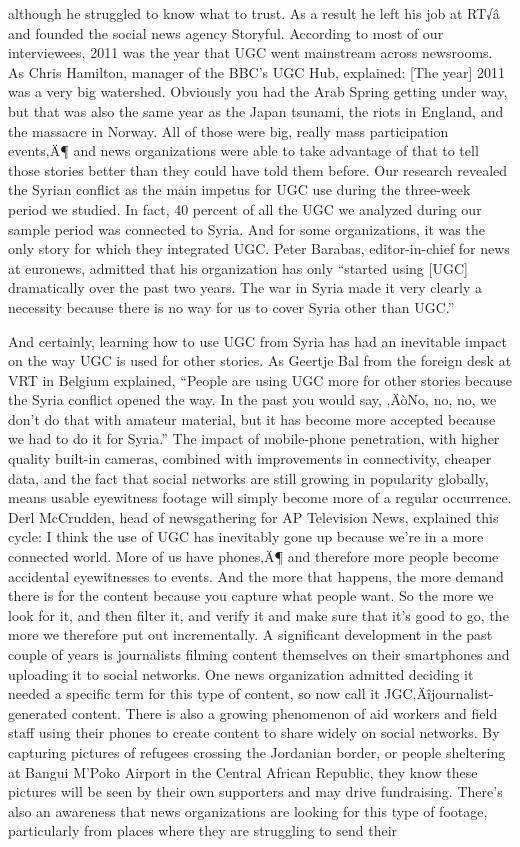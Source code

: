\documentclass[symmetric, notoc, nobib]{towcenter-book}
\begin{document}
although he struggled to know what to trust. As a result he left his job at
RT√â and founded the social news agency Storyful.
According to most of our interviewees, 2011 was the year that UGC went
mainstream across newsrooms. As Chris Hamilton, manager of the BBC's
UGC Hub, explained:
[The year] 2011 was a very big watershed. Obviously you had the
Arab Spring getting under way, but that was also the same year as
the Japan tsunami, the riots in England, and the massacre in Norway.
All of those were big, really mass participation events‚Ä¶ and news
organizations were able to take advantage of that to tell those stories
better than they could have told them before.
Our research revealed the Syrian conflict as the main impetus for UGC use
during the three-week period we studied. In fact, 40 percent of all the UGC
we analyzed during our sample period was connected to Syria. And for
some organizations, it was the only story for which they integrated UGC.
Peter Barabas, editor-in-chief for news at euronews, admitted that his organization
has only ``started using [UGC] dramatically over the past two years.
The war in Syria made it very clearly a necessity because there is no way for
us to cover Syria other than UGC.''

And certainly, learning how to use UGC from Syria has had an inevitable
impact on the way UGC is used for other stories. As Geertje Bal from the
foreign desk at VRT in Belgium explained, ``People are using UGC more
for other stories because the Syria conflict opened the way. In the past you
would say, ‚ÄòNo, no, no, we don't do that with amateur material, but it has
become more accepted because we had to do it for Syria.''
The impact of mobile-phone penetration, with higher quality built-in cameras,
combined with improvements in connectivity, cheaper data, and the
fact that social networks are still growing in popularity globally, means
usable eyewitness footage will simply become more of a regular occurrence.
Derl McCrudden, head of newsgathering for AP Television News, explained
this cycle:
I think the use of UGC has inevitably gone up because we're in a more
connected world. More of us have phones‚Ä¶ and therefore more people
become accidental eyewitnesses to events. And the more that
happens, the more demand there is for the content because you capture
what people want. So the more we look for it, and then filter it,
and verify it and make sure that it's good to go, the more we therefore
put out incrementally.
A significant development in the past couple of years is journalists filming
content themselves on their smartphones and uploading it to social networks.
One news organization admitted deciding it needed a specific term
for this type of content, so now call it JGC‚Äîjournalist-generated content.
There is also a growing phenomenon of aid workers and field staff using their
phones to create content to share widely on social networks. By capturing
pictures of refugees crossing the Jordanian border, or people sheltering at
Bangui M'Poko Airport in the Central African Republic, they know these
pictures will be seen by their own supporters and may drive fundraising.
There's also an awareness that news organizations are looking for this type
of footage, particularly from places where they are struggling to send their
\end{document}
